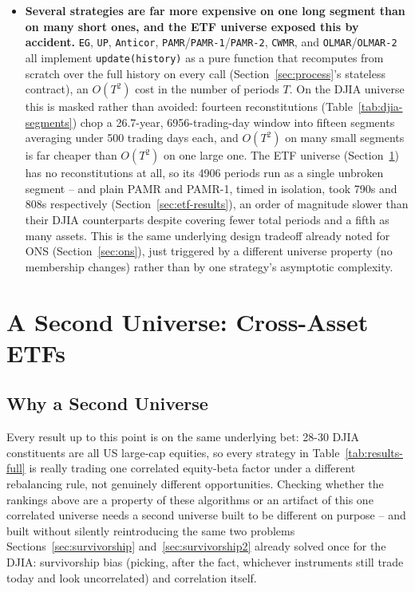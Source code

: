 \documentclass[11pt]{article}
\begin{document}
\begin{itemize}
    already-reported Table~\ref{tab:results-full} numbers. Left open for
    that reason rather than attempted alongside this paper's other
    results.
    \item \textbf{Several strategies are far more expensive on one long
    segment than on many short ones, and the ETF universe exposed this
    by accident.} \texttt{EG}, \texttt{UP}, \texttt{Anticor},
    \texttt{PAMR}/\texttt{PAMR-1}/\texttt{PAMR-2}, \texttt{CWMR}, and
    \texttt{OLMAR}/\texttt{OLMAR-2} all implement \texttt{update(history)}
    as a pure function that recomputes from scratch over the full history
    on every call (Section~\ref{sec:process}'s stateless contract), an
    $O(T^2)$ cost in the number of periods $T$. On the DJIA universe this
    is masked rather than avoided: fourteen reconstitutions
    (Table~\ref{tab:djia-segments}) chop a 26.7-year, 6956-trading-day
    window into fifteen segments averaging under 500 trading days each,
    and $O(T^2)$ on many small segments is far cheaper than $O(T^2)$ on
    one large one.
    The ETF universe (Section~\ref{sec:etf}) has no reconstitutions at
    all, so its 4906 periods run as a single unbroken segment -- and
    plain PAMR and PAMR-1, timed in isolation, took 790s and 808s
    respectively (Section~\ref{sec:etf-results}), an order of magnitude
    slower than their DJIA counterparts despite covering fewer total
    periods and a fifth as many assets. This is the same underlying
    design tradeoff already noted for ONS (Section~\ref{sec:ons}), just
    triggered by a different universe property (no membership changes)
    rather than by one strategy's asymptotic complexity.
\end{itemize}

\section{A Second Universe: Cross-Asset ETFs}
\label{sec:etf}

\subsection{Why a Second Universe}

Every result up to this point is on the same underlying bet: 28-30 DJIA
constituents are all US large-cap equities, so every strategy in
Table~\ref{tab:results-full} is really trading one correlated
equity-beta factor under a different rebalancing rule, not genuinely
different opportunities. Checking whether the rankings above are a
property of these algorithms or an artifact of this one correlated
universe needs a second universe built to be different on purpose --
and built without silently reintroducing the same two problems
Sections~\ref{sec:survivorship} and~\ref{sec:survivorship2} already
solved once for the DJIA: survivorship bias (picking, after the fact,
whichever instruments still trade today and look uncorrelated) and
correlation itself.
\end{document}
